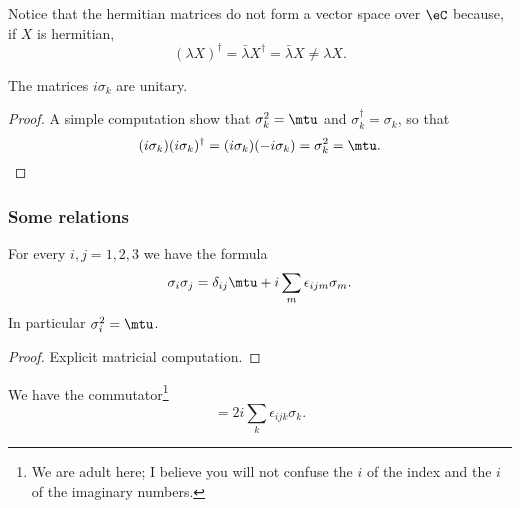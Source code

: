 Notice that the hermitian matrices do not form a vector space over \( \eC\) because, if \( X\) is hermitian,
\begin{equation}
    (\lambda X)^{\dag}=\bar \lambda X^{\dag}=\bar \lambda X\neq \lambda X.
\end{equation}

\begin{lemma}
    The matrices \( i\sigma_k\) are unitary.
\end{lemma}

\begin{proof}
    A simple computation show that \( \sigma_k^2=\mtu\) and \( \sigma_k^{\dag}=\sigma_k\), so that 
    \begin{equation}
        (i\sigma_k)(i\sigma_k)^{\dag}=(i\sigma_k)(-i\sigma_k)=\sigma_k^2=\mtu.
    \end{equation}
\end{proof}

\subsubsection{Some relations}

\begin{lemma}       \label{LEMooIBJMooTYnooZ}
    For every \( i,j=1,2,3\) we have the formula
    \begin{equation}
        \sigma_i\sigma_j=\delta_{ij}\mtu+i\sum_m\epsilon_{ijm}\sigma_m.
    \end{equation}
    In particular \( \sigma_i^2=\mtu\).
\end{lemma}

\begin{proof}
    Explicit matricial computation.
\end{proof}

\begin{lemma}       \label{LEMooJRWXooMkzRnk}
    We have the commutator\footnote{We are adult here; I believe you will not confuse the \( i\) of the index and the \( i\) of the imaginary numbers.}
    \begin{equation}
        [\sigma_i,\sigma_j]=2i\sum_k\epsilon_{ijk}\sigma_k.
    \end{equation}
\end{lemma}

